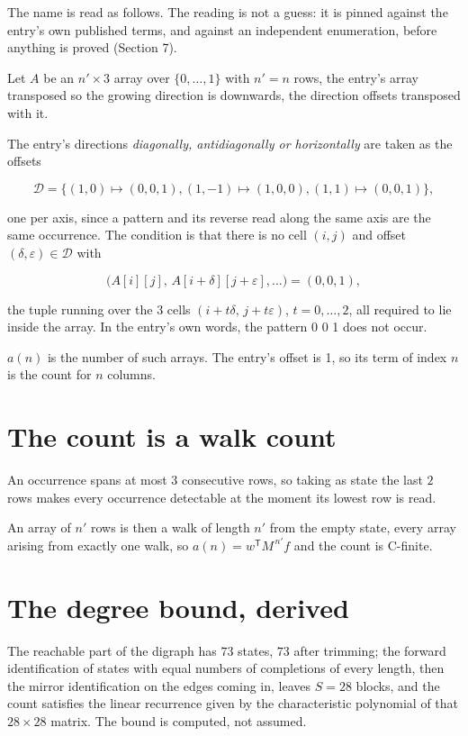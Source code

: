 \documentclass[11pt]{article}
\theoremstyle{definition}
\begin{document}
The name is read as follows. The reading is not a guess: it is pinned against the entry's own published terms, and against an independent enumeration, before anything is proved (Section 7).

Let $A$ be an $n' \times 3$ array over $\{0,\dots,1\}$ with $n' = n$ rows, the entry's array transposed so the growing direction is downwards, the direction offsets transposed with it.

The entry's directions {\itshape diagonally, antidiagonally or horizontally} are taken as the offsets

\[\mathcal{D} = \{(1,0)\mapsto(0,0,1), (1,-1)\mapsto(1,0,0), (1,1)\mapsto(0,0,1)\},\]

one per axis, since a pattern and its reverse read along the same axis are the same occurrence. The condition is that there is no cell $(i,j)$ and offset $(\delta,\varepsilon)\in\mathcal{D}$ with

\[\bigl(A[i][j],\,A[i{+}\delta][j{+}\varepsilon],\dots\bigr) = (0, 0, 1),\]

the tuple running over the $3$ cells $(i+t\delta,\,j+t\varepsilon)$, $t = 0,\dots,2$, all required to lie inside the array. In the entry's own words, the pattern 0 0 1 does not occur.

$a(n)$ is the number of such arrays. The entry's offset is 1, so its term of index $n$ is the count for $n$ columns.

\section{The count is a walk count}

An occurrence spans at most $3$ consecutive rows, so taking as state the last $2$ rows makes every occurrence detectable at the moment its lowest row is read.

An array of $n'$ rows is then a walk of length $n'$ from the empty state, every array arising from exactly one walk, so $a(n) = w^{\mathsf T}M^{\,n'}f$ and the count is C-finite.

\section{The degree bound, derived}

The reachable part of the digraph has $73$ states, $73$ after trimming; the forward identification of states with equal numbers of completions of every length, then the mirror identification on the edges coming in, leaves $S = 28$ blocks, and the count satisfies the linear recurrence given by the characteristic polynomial of that $28\times28$ matrix. The bound is computed, not assumed.
\end{document}
